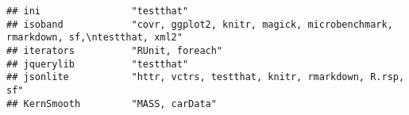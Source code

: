 \documentclass[
]{article}
\begin{document}
\begin{verbatim}
## ini                "testthat"                                                                                                                                                                                                                                                                                                                                                                                                                                                                        
## isoband            "covr, ggplot2, knitr, magick, microbenchmark, rmarkdown, sf,\ntestthat, xml2"                                                                                                                                                                                                                                                                                                                                                                                                    
## iterators          "RUnit, foreach"                                                                                                                                                                                                                                                                                                                                                                                                                                                                  
## jquerylib          "testthat"                                                                                                                                                                                                                                                                                                                                                                                                                                                                        
## jsonlite           "httr, vctrs, testthat, knitr, rmarkdown, R.rsp, sf"                                                                                                                                                                                                                                                                                                                                                                                                                              
## KernSmooth         "MASS, carData"                                                                                                                                                                                                                                                                                                                                                                                                                                                                   

\end{verbatim}
\end{document}

